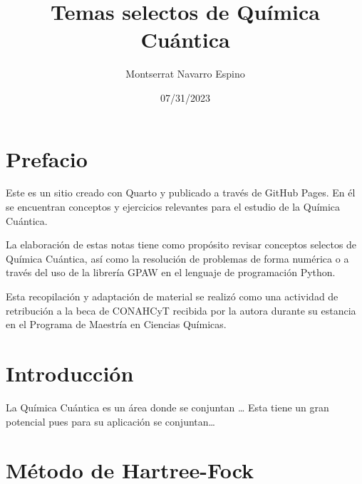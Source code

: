 \documentclass[
  letterpaper,
  DIV=11,
  numbers=noendperiod]{scrreprt}
\title{Temas selectos de Química Cuántica}
\author{Montserrat Navarro Espino}
\date{07/31/2023}
\renewcommand*\contentsname{Table of contents}
\newcommand\contentsname{Table of contents}
\begin{document}
\maketitle
\ifdefined\Shaded\renewenvironment{Shaded}{\begin{tcolorbox}[frame hidden, interior hidden, borderline west={3pt}{0pt}{shadecolor}, sharp corners, boxrule=0pt, breakable, enhanced]}{\end{tcolorbox}}\fi

\renewcommand*\contentsname{Table of contents}
{
\hypersetup{linkcolor=}
\setcounter{tocdepth}{2}
\tableofcontents
}

\hypertarget{prefacio}{%
\chapter*{Prefacio}\label{prefacio}}

Este es un sitio creado con Quarto y publicado a través de GitHub Pages.
En él se encuentran conceptos y ejercicios relevantes para el estudio de
la Química Cuántica.

La elaboración de estas notas tiene como propósito revisar conceptos
selectos de Química Cuántica, así como la resolución de problemas de
forma numérica o a través del uso de la librería GPAW en el lenguaje de
programación Python.

Esta recopilación y adaptación de material se realizó como una actividad
de retribución a la beca de CONAHCyT recibida por la autora durante su
estancia en el Programa de Maestría en Ciencias Químicas.


\hypertarget{introducciuxf3n}{%
\chapter{Introducción}\label{introducciuxf3n}}

La Química Cuántica es un área donde se conjuntan \ldots{} Esta tiene un
gran potencial pues para su aplicación se conjuntan\ldots{}


\hypertarget{muxe9todo-de-hartree-fock}{%
\chapter{Método de Hartree-Fock}\label{muxe9todo-de-hartree-fock}}
\end{document}
